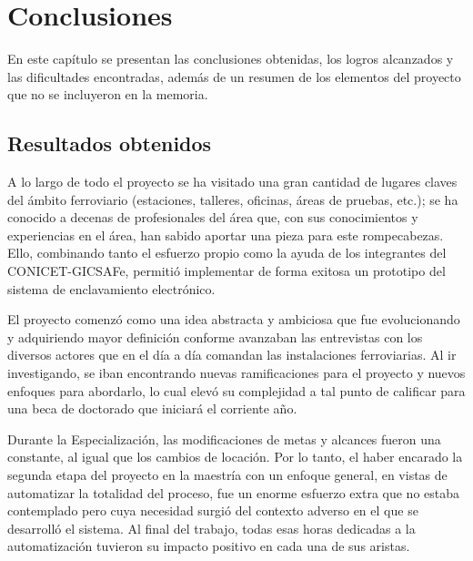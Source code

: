 
\chapter{Conclusiones} %

\label{Chapter5} %


En este capítulo se presentan las conclusiones obtenidas, los logros alcanzados y las dificultades encontradas, además de un resumen de los elementos del proyecto que no se incluyeron en la memoria.


\section{Resultados obtenidos}
	
	A lo largo de todo el proyecto se ha visitado una gran cantidad de lugares claves del ámbito ferroviario (estaciones, talleres, oficinas, áreas de pruebas, etc.); se ha conocido a decenas de profesionales del área que, con sus conocimientos y experiencias en el área, han sabido aportar una pieza para este rompecabezas. Ello, combinando tanto el esfuerzo propio como la ayuda de los integrantes del CONICET-GICSAFe, permitió implementar de forma exitosa un prototipo del sistema de enclavamiento electrónico.
	
	El proyecto comenzó como una idea abstracta y ambiciosa que fue evolucionando y adquiriendo mayor definición conforme avanzaban las entrevistas con los diversos actores que en el día a día comandan las instalaciones ferroviarias. Al ir investigando, se iban encontrando nuevas ramificaciones para el proyecto y nuevos enfoques para abordarlo, lo cual elevó su complejidad a tal punto de calificar para una beca de doctorado que iniciará el corriente año.
	
	Durante la Especialización, las modificaciones de metas y alcances fueron una constante, al igual que los cambios de locación. Por lo tanto, el haber encarado la segunda etapa del proyecto en la maestría con un enfoque general, en vistas de automatizar la totalidad del proceso, fue un enorme esfuerzo extra que no estaba contemplado pero cuya necesidad surgió del contexto adverso en el que se desarrolló el sistema. Al final del trabajo, todas esas horas dedicadas a la automatización tuvieron su impacto positivo en cada una de sus aristas.
		
